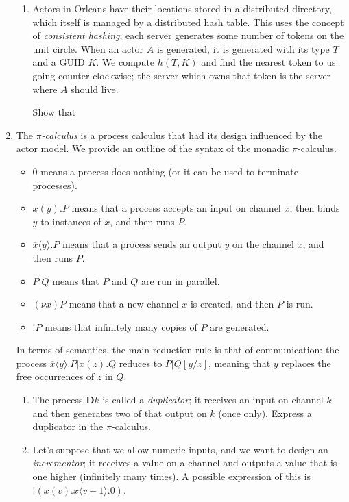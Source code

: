\documentclass[12pt, a4paper]{article}
\begin{document}
\begin{enumerate}
\begin{enumerate}
\item Actors in Orleans have their locations stored in a distributed directory,
which itself is managed by a distributed hash table. This uses the concept of
\textit{consistent hashing}; each server generates some number of tokens on
the unit circle. When an actor $A$ is generated, it is generated with its type $T$
and a GUID $K$. We compute $h(T, K)$ and find the nearest token to us going 
counter-clockwise; the server which owns that token is the server where $A$ should 
live.

Show that %

\end{enumerate}

\item The \textit{$\pi$-calculus} is a process calculus that had its design 
influenced by the actor model. We provide an outline of the syntax of the 
monadic $\pi$-calculus.

\begin{itemize}
\item $0$ means a process does nothing (or it can be used to terminate processes).
\item $x(y).P$ means that a process accepts an input on channel $x$, then binds
$y$ to instances of $x$, and then runs $P$.
\item $\overline{x} \langle y \rangle. P$ means that a process sends an output
$y$ on the channel $x$, and then runs $P$.
\item $P | Q$ means that $P$ and $Q$ are run in parallel.
\item $(\nu x) P$ means that a new channel $x$ is created, and then $P$ is run.
\item $!P$ means that infinitely many copies of $P$ are generated.
\end{itemize}

In terms of semantics, the main reduction rule is that of communication: the
process $\overline{x} \langle y \rangle. P | x(z). Q$ reduces to $P|Q[y/z]$,
meaning that $y$ replaces the free occurrences of $z$ in $Q$.

\begin{enumerate}
\item The process $\textbf{D} k$ is called a \textit{duplicator}; it receives
an input on channel $k$ and then generates two of that output on $k$ (once only). 
Express a duplicator in the $\pi$-calculus.

\item Let's suppose that we allow numeric inputs, and we want to design an
\textit{incrementor}; it receives a value on a channel and outputs a value that
is one higher (infinitely many times). A possible expression of this is
$!(x(v).\overline{x} \langle v + 1 \rangle.0)$.


\end{enumerate}
\end{enumerate}
\end{document}
